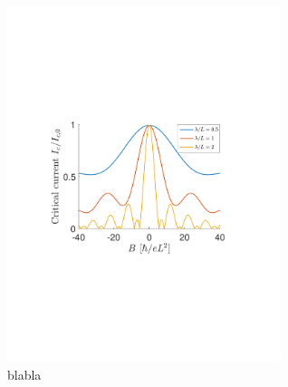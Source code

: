 \begin{figure}[hhh]
\centering
\includegraphics[width=8cm,clip=true,trim=3cm 8cm 4cm 9cm]{fig/critical_Dist2_phi_pi-2}
\caption{blabla}
\label{fig:critical_dist2_pi-2}
\end{figure}